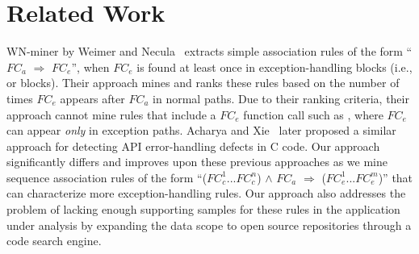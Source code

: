 \section{Related Work}
\label{sec:related}
\vspace*{-1ex}
WN-miner by Weimer and Necula~\cite{WeimerN05} extracts simple association rules of the form
``$FC_a$ $\Rightarrow$ $FC_e$'', when $FC_e$ is found at least once in exception-handling
blocks (i.e.,  or  blocks). 
Their approach mines and ranks these rules based on the number of times
$FC_e$ appears after $FC_a$ in normal paths. Due to their ranking criteria,
their approach cannot mine rules that include a $FC_e$ function call such
as , where $FC_e$ can appear \emph{only} in exception
paths. Acharya and Xie~\cite{acharya07techreporterrorhandling} later
proposed a similar approach for detecting API error-handling defects
in C code. Our approach significantly differs and improves upon these previous approaches
as we mine sequence association rules of the form ``($FC_c^1$...$FC_c^n$) $\wedge$ $FC_a$ $\Rightarrow$ ($FC_e^1$...$FC_e^m$)'' that can characterize more exception-handling rules.
Our approach also addresses the problem of lacking enough supporting
samples for these rules in the application under analysis by expanding the data scope to open source repositories
through a code search engine. 



